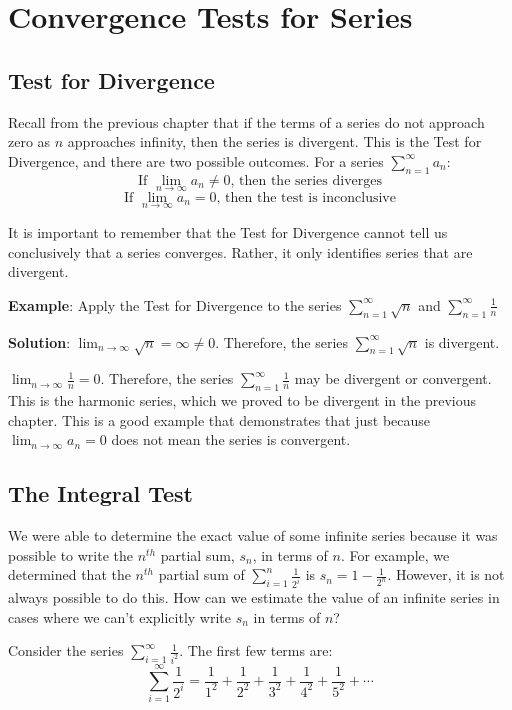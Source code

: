 \chapter{Convergence Tests for Series}

\section{Test for Divergence}
Recall from the previous chapter that if the terms of a series do not approach 
zero as $n$ approaches infinity, then the series is divergent. This is the 
Test for Divergence, and there are two possible 
outcomes. For a series $\sum_{n = 1}^\infty a_n$:
$$\text{If } \lim_{n \to \infty} a_n \neq 0 \text{, then the series diverges}$$
$$\text{If } \lim_{n \to \infty} a_n = 0 \text{, then the test is inconclusive}$$

It is important to remember that the Test for Divergence cannot tell us 
conclusively that a series converges. Rather, it only identifies series that 
are divergent. 

\textbf{Example}: Apply the Test for Divergence to the series $\sum_{n=1}^
\infty \sqrt{n}$ and $\sum_{n=1}^\infty \frac{1}{n}$

\textbf{Solution}: $\lim_{n \to \infty} \sqrt{n} = \infty \neq 0$. Therefore, 
the series $\sum_{n=1}^\infty \sqrt{n}$ is divergent. 

$\lim_{n \to \infty} \frac{1}{n} = 0$. Therefore, the series $\sum_{n=1}^
\infty \frac{1}{n}$ may be divergent or convergent. This is the harmonic 
series, which we proved to be divergent in the previous chapter. This is a 
good example that demonstrates that just because $\lim_{n \to \infty} a_n = 
0$ does not mean the series is convergent. 

\section{The Integral Test}
We were able to determine the exact value of some infinite series because it 
was possible to write the $n^{th}$ partial sum, $s_n$, in terms of $n$. For 
example, we determined that the $n^{th}$ partial sum of $\sum_{i = 1}^n 
\frac{1}{2^i}$ is $s_n = 1 - \frac{1}{2^n}$. However, it is not always possible 
to do this. How can we estimate the value of an infinite series in cases where 
we can't explicitly write $s_n$ in terms of $n$? 

Consider the series $\sum_{i = 1}^\infty \frac{1}{i^2}$. The first few terms 
are:
$$\sum_{i = 1}^\infty \frac{1}{2^i} = \frac{1}{1^2} + \frac{1}{2^2} + 
\frac{1}{3^2} + \frac{1}{4^2} + \frac{1}{5^2} + \cdots$$

